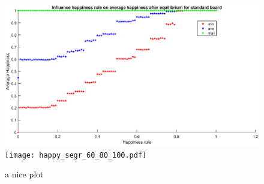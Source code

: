 \documentclass{article}
\begin{document}
\begin{figure}[h]
    \centering

    \includegraphics{happinessregel-gemhappinesseind-2.eps}
    \texttt{[image: happy\_segr\_60\_80\_100.pdf]}
    \caption{a nice plot}
    \label{fig:mesh1}
\end{figure}
\end{document}
